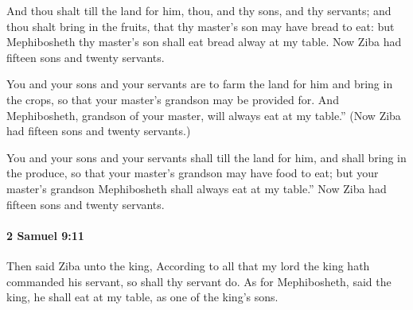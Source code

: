 			\begin{versebox}
					\item[BHS] 
					\item[ASV] And thou shalt till the land for him, thou, and thy sons, and thy servants; and thou shalt bring in the fruits, that thy master's son may have bread to eat: but Mephibosheth thy master's son shall eat bread alway at my table. Now Ziba had fifteen sons and twenty servants.
					\item[NIV] You and your sons and your servants are to farm the land for him and bring in the crops, so that your master’s grandson may be provided for. And Mephibosheth, grandson of your master, will always eat at my table.” (Now Ziba had fifteen sons and twenty servants.)
					\item[NRSV] You and your sons and your servants shall till the land for him, and shall bring in the produce, so that your master’s grandson may have food to eat; but your master’s grandson Mephibosheth shall always eat at my table.” Now Ziba had fifteen sons and twenty servants.
			\end{versebox}

		\paragraph{2 Samuel 9:11} %
			\label{2SAMUEL-9-11}

			Then said Ziba unto the king, According to all that my lord the king hath commanded his servant, so shall thy servant do. As for Mephibosheth, said the king, he shall eat at my table, as one of the king’s sons.

